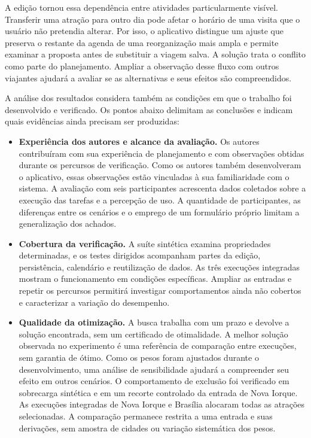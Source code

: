 A edição tornou essa dependência entre atividades particularmente visível. Transferir uma atração para outro dia pode afetar o horário de uma visita que o usuário não pretendia alterar. Por isso, o aplicativo distingue um ajuste que preserva o restante da agenda de uma reorganização mais ampla e permite examinar a proposta antes de substituir a viagem salva. A solução trata o conflito como parte do planejamento. Ampliar a observação desse fluxo com outros viajantes ajudará a avaliar se as alternativas e seus efeitos são compreendidos.

A análise dos resultados considera também as condições em que o trabalho foi desenvolvido e verificado. Os pontos abaixo delimitam as conclusões e indicam quais evidências ainda precisam ser produzidas:
\begin{itemize}
  \item \textbf{Experiência dos autores e alcance da avaliação.} Os autores contribuíram com sua experiência de planejamento e com observações obtidas durante os percursos de verificação. Como os autores também desenvolveram o aplicativo, essas observações estão vinculadas à sua familiaridade com o sistema. A avaliação com seis participantes acrescenta dados coletados sobre a execução das tarefas e a percepção de uso. A quantidade de participantes, as diferenças entre os cenários e o emprego de um formulário próprio limitam a generalização dos achados.
  \item \textbf{Cobertura da verificação.} A suíte sintética examina propriedades determinadas, e os testes dirigidos acompanham partes da edição, persistência, calendário e reutilização de dados. As três execuções integradas mostram o funcionamento em condições específicas. Ampliar as entradas e repetir os percursos permitirá investigar comportamentos ainda não cobertos e caracterizar a variação do desempenho.
  \item \textbf{Qualidade da otimização.} A busca trabalha com um prazo e devolve a solução encontrada, sem um certificado de otimalidade. A melhor solução observada no experimento é uma referência de comparação entre execuções, sem garantia de ótimo. Como os pesos foram ajustados durante o desenvolvimento, uma análise de sensibilidade ajudará a compreender seu efeito em outros cenários. O comportamento de exclusão foi verificado em sobrecarga sintética e em um recorte controlado da entrada de Nova Iorque. As execuções integradas de Nova Iorque e Brasília alocaram todas as atrações selecionadas. A comparação permanece restrita a uma entrada e suas derivações, sem amostra de cidades ou variação sistemática dos pesos.

\end{itemize}
